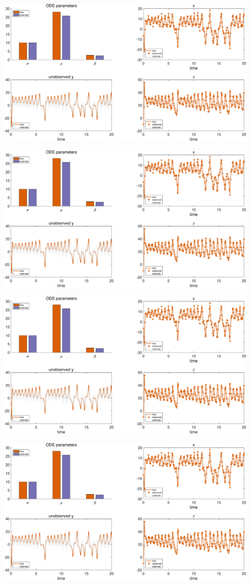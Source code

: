 {\includegraphics [width=5in]{Lorenz_attractor_4_16.eps}

\includegraphics [width=5in]{Lorenz_attractor_4_17.eps}

\includegraphics [width=5in]{Lorenz_attractor_4_18.eps}

\includegraphics [width=5in]{Lorenz_attractor_4_19.eps}

}

